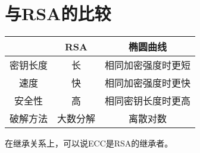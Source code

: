 \documentclass{article}
\theoremstyle{definition}
\begin{document}
\section{与RSA的比较}
\begin{center}
\begin{tabular}{ |c|c|c|} 
\hline
&RSA&椭圆曲线 \\ 
\hline
密钥长度&长&相同加密强度时更短\\ 
\hline
速度 & 快 & 相同加密强度时更快 \\ 
\hline
安全性&高&相同密钥长度时更高 \\ 
\hline
破解方法 & 大数分解 & 离散对数 \\ 
\hline
\end{tabular}
\end{center}

在继承关系上，可以说ECC是RSA的继承者。
\end{document}
